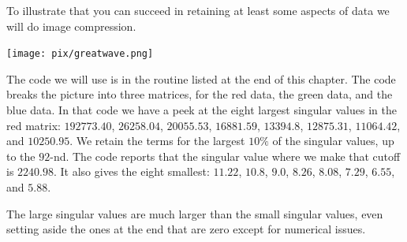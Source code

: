To illustrate that you can succeed in retaining at least some aspects of data
we will do image compression.
\begin{center}
  \texttt{[image: pix/greatwave.png]} %
\end{center}

The code we will use is in the  routine 
listed at the end of this chapter.
The code breaks the picture into three matrices, for the red data, the 
green data, and the blue data.
In that code we have a peek at the eight largest singular
values in the red matrix:
  $192773.40$,
  $26258.04$,
  $20055.53$,
  $16881.59$,
  $13394.8$,
  $12875.31$,
  $11064.42$, and
  $10250.95$.
We retain the terms for the largest $10\%$ of the singular values,
up to the $92$-nd. 
The code reports that
the singular value where we make that cutoff is 
$2240.98$.
It also gives the eight smallest:
  $11.22$,
  $10.8$,
  $9.0$,
  $8.26$,
  $8.08$,
  $7.29$,
  $6.55$, and
  $5.88$.

The large singular values are much larger than the small singular values,
even setting aside the ones at the end
that are zero except for numerical issues.

